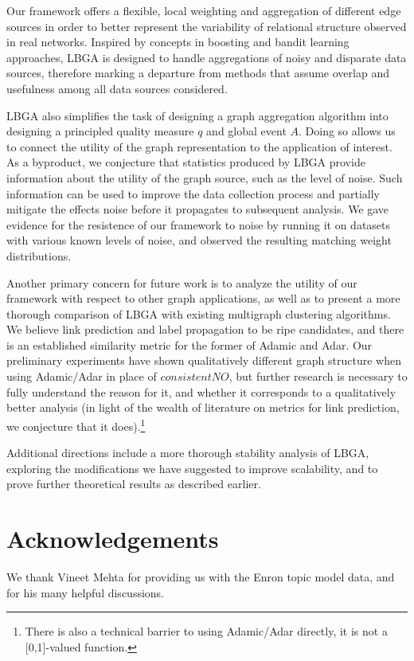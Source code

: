\documentclass{article}
\begin{document}
Our framework offers a flexible, local weighting and aggregation of different
edge sources in order to better represent the variability of relational
structure observed in real networks. Inspired by concepts in boosting and
bandit learning approaches, LBGA is designed to handle aggregations of noisy
and disparate data sources, therefore marking a departure from methods that
assume overlap and usefulness among all data sources considered. 

LBGA also simplifies the task of designing a graph aggregation algorithm into
designing a principled quality measure $q$ and global event $A$. Doing so
allows us to connect the utility of the graph representation to the application
of interest. As a byproduct, we conjecture that statistics produced by LBGA
provide information about the utility of the graph source, such as the level of
noise. Such information can be used to improve the data collection process and
partially mitigate the effects noise before it propagates to subsequent
analysis. We gave evidence for the resistence of our framework to noise by
running it on datasets with various known levels of noise, and observed the
resulting matching weight distributions. 

Another primary concern for future work is to analyze the utility of our
framework with respect to other graph applications, as well as to present a
more thorough comparison of LBGA with existing multigraph clustering
algorithms. We believe link prediction and label propagation to be ripe
candidates, and there is an established similarity metric for the former of
Adamic and Adar\cite{Adamic01}. Our preliminary experiments have shown
qualitatively different graph structure when using Adamic/Adar in place of
$consistentNO$, but further research is necessary to fully understand the reason
for it, and whether it corresponds to a qualitatively better analysis (in light
of the wealth of literature on metrics for link prediction, we conjecture that
it does).\footnote{There is also a technical barrier to using Adamic/Adar
directly, it is not a [0,1]-valued function.}

Additional directions include a more thorough stability analysis of LBGA,
exploring the modifications we have suggested to improve scalability, and to
prove further theoretical results as described earlier.

\section{Acknowledgements} We thank Vineet Mehta for providing us with the
Enron topic model data, and for his many helpful discussions.



\end{document}
